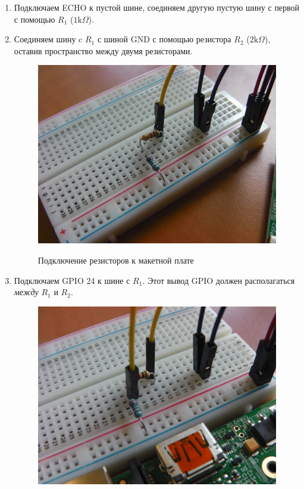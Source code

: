 \documentclass[a4paper, 14pt]{article}
\begin{document}
\begin{enumerate}
\begin{figure}[H]
	      \end{figure}
	\item Подключаем ECHO к пустой шине, соединяем другую пустую шину с первой с помощью $R_1$ ($1 \text{k}\Omega$).
	\item Соединяем шину c $R_1$ с шиной GND с помощью резистора $R_2$ ($2 \text{k}\Omega$), оставив пространство между двумя резисторами.
	      \begin{figure}[H]
		      \centering
		      \includegraphics[width=14cm]{screenshots/9.png}\\
		      \caption{Подключение резисторов к макетной плате}
	      \end{figure}
	\item Подключаем GPIO 24 к шине с $R_1$. Этот вывод GPIO должен располагаться \textit{между} $R_1$ и $R_2$.
	      \begin{figure}[H]
		      \centering
		      \includegraphics[width=14cm]{screenshots/10.png}\\

\end{figure}
\end{enumerate}
\end{document}
